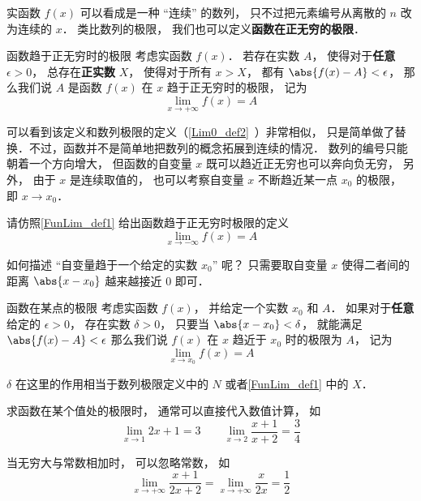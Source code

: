

实函数 $f(x)$ 可以看成是一种 “连续” 的数列， 只不过把元素编号从离散的 $n$ 改为连续的 $x$． 类比数列的极限， 我们也可以定义\textbf{函数在正无穷的极限}．

\begin{definition}{函数趋于正无穷时的极限}\label{FunLim_def1}
考虑实函数 $f(x)$． 若存在实数 $A$， 使得对于\textbf{任意} $\epsilon>0$， 总存在\textbf{正实数} $X$， 使得对于所有 $x>X$， 都有 $\abs{f(x)-A}<\epsilon$， 那么我们说 $A$ 是函数 $f(x)$ 在 $x$ 趋于正无穷时的极限， 记为
\begin{equation}
\lim\limits_{x\to +\infty} f(x) = A
\end{equation}
\end{definition}

可以看到该定义和数列极限的定义（\autoref{Lim0_def2}~）非常相似， 只是简单做了替换．不过，函数并不是简单地把数列的概念拓展到连续的情况． 数列的编号只能朝着一个方向增大， 但函数的自变量 $x$ 既可以趋近正无穷也可以奔向负无穷， 另外， 由于 $x$ 是连续取值的， 也可以考察自变量 $x$ 不断趋近某一点 $x_0$ 的极限， 即 $x\to x_0$．

\begin{exercise}{}
请仿照\autoref{FunLim_def1} 给出函数趋于正无穷时极限的定义
\begin{equation}
\lim\limits_{x\to -\infty} f(x) = A
\end{equation}
\end{exercise}

如何描述 “自变量趋于一个给定的实数 $x_0$” 呢？ 只需要取自变量 $x$ 使得二者间的距离 $\abs{x-x_0}$ 越来越接近 $0$ 即可．

\begin{definition}{函数在某点的极限}\label{FunLim_def3}
考虑实函数 $f(x)$， 并给定一个实数 $x_0$ 和 $A$． 如果对于\textbf{任意}给定的 $\epsilon > 0$， 存在实数 $\delta > 0$， 只要当 $\abs{x-x_0} < \delta$， 就能满足 $\abs{f(x)-A} < \epsilon$ 那么我们说 $f(x)$ 在 $x$ 趋近于 $x_0$ 时的极限为 $A$， 记为
\begin{equation}
\lim\limits_{x\to x_0}f(x)=A
\end{equation}
\end{definition}
$\delta$ 在这里的作用相当于数列极限定义中的 $N$ 或者\autoref{FunLim_def1} 中的 $X$．

\begin{example}{}
求函数在某个值处的极限时， 通常可以直接代入数值计算， 如
\begin{equation}
\lim_{x\to 1} 2x + 1 = 3 \qquad \lim_{x\to 2}\frac{x + 1}{x + 2} = \frac34
\end{equation}

当无穷大与常数相加时， 可以忽略常数， 如
\begin{equation}
\lim_{x\to +\infty} \frac{x + 1}{2x + 2} = \lim_{x\to +\infty} \frac{x}{2x} = \frac12
\end{equation}
\end{example}

